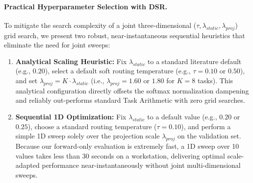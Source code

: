 \paragraph{Practical Hyperparameter Selection with DSR.}
To mitigate the search complexity of a joint three-dimensional ($\tau, \lambda_{static}, \lambda_{proj}$) grid search, we present two robust, near-instantaneous sequential heuristics that eliminate the need for joint sweeps:
\begin{enumerate}
    \item \textbf{Analytical Scaling Heuristic:} Fix $\lambda_{static}$ to a standard literature default (e.g., $0.20$), select a default soft routing temperature (e.g., $\tau=0.10$ or $0.50$), and set $\lambda_{proj} = K \cdot \lambda_{static}$ (i.e., $\lambda_{proj} = 1.60$ or $1.80$ for $K=8$ tasks). This analytical configuration directly offsets the softmax normalization dampening and reliably out-performs standard Task Arithmetic with zero grid searches.
    \item \textbf{Sequential 1D Optimization:} Fix $\lambda_{static}$ to a default value (e.g., $0.20$ or $0.25$), choose a standard routing temperature ($\tau=0.10$), and perform a simple 1D sweep solely over the projection scale $\lambda_{proj}$ on the validation set. Because our forward-only evaluation is extremely fast, a 1D sweep over 10 values takes less than 30 seconds on a workstation, delivering optimal scale-adapted performance near-instantaneously without joint multi-dimensional sweeps.
\end{enumerate}

